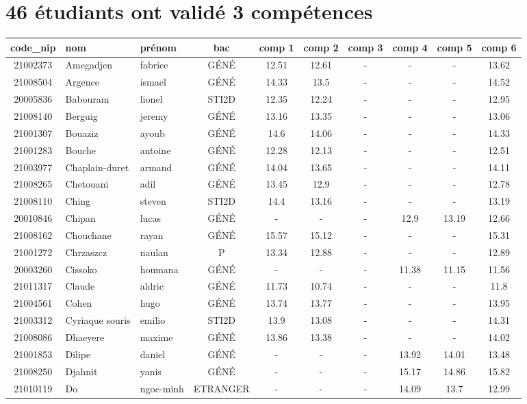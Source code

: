 \documentclass{article}%
\begin{document}
\section*{46 étudiants ont validé 3 compétences}%
\label{sec:46tudiantsontvalid3comptences}%
\begin{tabular}{|c|l|l|c|c|c|c|c|c|c|}%
\hline%
\rowcolor{bleu}%
code\_nip&nom&prénom&bac&comp 1&comp 2&comp 3&comp 4&comp 5&comp 6\\%
\hline%
21002373&Amegadjen&fabrice&GÉNÉ&12.51&12.61&{-}&{-}&{-}&13.62\\%
\hline%
21008504&Argence&ismael&GÉNÉ&14.33&13.5&{-}&{-}&{-}&14.52\\%
\hline%
20005836&Babouram&lionel&STI2D&12.35&12.24&{-}&{-}&{-}&12.95\\%
\hline%
21008140&Berguig&jeremy&GÉNÉ&13.16&13.35&{-}&{-}&{-}&13.06\\%
\hline%
21001307&Bouaziz&ayoub&GÉNÉ&14.6&14.06&{-}&{-}&{-}&14.33\\%
\hline%
21001283&Bouche&antoine&GÉNÉ&12.28&12.13&{-}&{-}&{-}&12.51\\%
\hline%
21003977&Chaplain{-}duret&armand&GÉNÉ&14.04&13.65&{-}&{-}&{-}&14.11\\%
\hline%
21008265&Chetouani&adil&GÉNÉ&13.45&12.9&{-}&{-}&{-}&12.78\\%
\hline%
21008110&Ching&steven&STI2D&14.4&13.16&{-}&{-}&{-}&13.19\\%
\hline%
20010846&Chipan&lucas&GÉNÉ&{-}&{-}&{-}&12.9&13.19&12.66\\%
\hline%
21008162&Chouchane&rayan&GÉNÉ&15.57&15.12&{-}&{-}&{-}&15.31\\%
\hline%
21001272&Chrzaszcz&naulan&P&13.34&12.88&{-}&{-}&{-}&12.89\\%
\hline%
20003260&Cissoko&houmana&GÉNÉ&{-}&{-}&{-}&11.38&11.15&11.56\\%
\hline%
21011317&Claude&aldric&GÉNÉ&11.73&10.74&{-}&{-}&{-}&11.8\\%
\hline%
21004561&Cohen&hugo&GÉNÉ&13.74&13.77&{-}&{-}&{-}&13.95\\%
\hline%
21003312&Cyriaque souris&emilio&STI2D&13.9&13.08&{-}&{-}&{-}&14.31\\%
\hline%
21008086&Dhaeyere&maxime&GÉNÉ&13.86&13.38&{-}&{-}&{-}&14.02\\%
\hline%
21001853&Dilipe&daniel&GÉNÉ&{-}&{-}&{-}&13.92&14.01&13.48\\%
\hline%
21008250&Djahnit&yanis&GÉNÉ&{-}&{-}&{-}&15.17&14.86&15.82\\%
\hline%
21010119&Do&ngoc{-}minh&ETRANGER&{-}&{-}&{-}&14.09&13.7&12.99\\%

\end{tabular}
\end{document}
